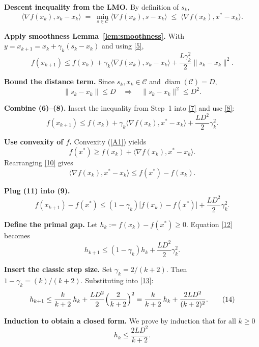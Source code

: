 \documentclass{article}
\begin{document}
\begin{enumerate}[label={\bf [Step \arabic*]}]
\item \textbf{Descent inequality from the LMO.}  
By definition of $s_{k}$,
\[
\langle\nabla f(x_{k}),s_{k}-x_{k}\rangle
\;=\;\min_{s\in\mathcal C}\langle\nabla f(x_{k}),s-x_{k}\rangle
\;\le\;\langle\nabla f(x_{k}),x^{*}-x_{k}\rangle .
\tag{6}
\]

\item \textbf{Apply smoothness Lemma~\ref{lem:smoothness}.}  
With $y=x_{k+1}=x_{k}+\gamma_{k}(s_{k}-x_{k})$ and using \eqref{5},
\[
f(x_{k+1})\le f(x_{k})+\gamma_{k}\langle\nabla f(x_{k}),s_{k}-x_{k}\rangle
+\frac{L\gamma_{k}^{2}}{2}\|s_{k}-x_{k}\|^{2}.
\tag{7}
\]

\item \textbf{Bound the distance term.}  
Since $s_{k},x_{k}\in\mathcal C$ and $\operatorname{diam}(\mathcal C)=D$,  
\[
\|s_{k}-x_{k}\|\le D\quad\Longrightarrow\quad 
\|s_{k}-x_{k}\|^{2}\le D^{2}.
\tag{8}
\]

\item \textbf{Combine (6)–(8).}  
Insert the inequality from Step~1 into \eqref{7} and use \eqref{8}:
\[
f(x_{k+1})\le f(x_{k})+\gamma_{k}\langle\nabla f(x_{k}),x^{*}-x_{k}\rangle
+\frac{L D^{2}}{2}\gamma_{k}^{2}.
\tag{9}
\]

\item \textbf{Use convexity of $f$.}  
Convexity (\ref{A1}) yields
\[
f(x^{*})\ge f(x_{k})+\langle\nabla f(x_{k}),x^{*}-x_{k}\rangle .
\tag{10}
\]
Rearranging \eqref{10} gives
\[
\langle\nabla f(x_{k}),x^{*}-x_{k}\rangle\le f(x^{*})-f(x_{k}).
\tag{11}
\]

\item \textbf{Plug (11) into (9).}  
\[
f(x_{k+1})-f(x^{*})\le (1-\gamma_{k})\bigl[f(x_{k})-f(x^{*})\bigr]
+\frac{L D^{2}}{2}\gamma_{k}^{2}.
\tag{12}
\]

\item \textbf{Define the primal gap.}  
Let $h_{k}:=f(x_{k})-f(x^{*})\ge0$.  Equation \eqref{12} becomes
\[
h_{k+1}\le (1-\gamma_{k})h_{k}+\frac{L D^{2}}{2}\gamma_{k}^{2}.
\tag{13}
\]

\item \textbf{Insert the classic step size.}  
Set $\gamma_{k}=2/(k+2)$. Then $1-\gamma_{k}=(k)/(k+2)$. Substituting into \eqref{13}:
\[
h_{k+1}\le \frac{k}{k+2}\,h_{k}+ \frac{L D^{2}}{2}\Bigl(\frac{2}{k+2}\Bigr)^{2}
= \frac{k}{k+2}\,h_{k}+ \frac{2L D^{2}}{(k+2)^{2}}.
\tag{14}
\]

\item \textbf{Induction to obtain a closed form.}  
We prove by induction that for all $k\ge0$
\[
h_{k}\le \frac{2L D^{2}}{k+2}.
\tag{15}
\]


\end{enumerate}
\end{document}
